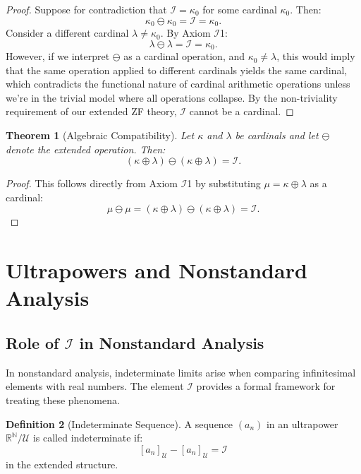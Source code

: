 \documentclass[12pt,a4paper]{article}
\newtheorem{theorem}{Theorem}[section]
\theoremstyle{definition}
\newtheorem{definition}[theorem]{Definition}
\theoremstyle{remark}
\begin{document}
\begin{proof}
Suppose for contradiction that $\mathcal{I} = \kappa_0$ for some cardinal $\kappa_0$. Then:
\[
\kappa_0 \ominus \kappa_0 = \mathcal{I} = \kappa_0.
\]
Consider a different cardinal $\lambda \neq \kappa_0$. By Axiom $\mathcal{I}$1:
\[
\lambda \ominus \lambda = \mathcal{I} = \kappa_0.
\]
However, if we interpret $\ominus$ as a cardinal operation, and $\kappa_0 \neq \lambda$, this would imply that the same operation applied to different cardinals yields the same cardinal, which contradicts the functional nature of cardinal arithmetic operations unless we're in the trivial model where all operations collapse. By the non-triviality requirement of our extended ZF theory, $\mathcal{I}$ cannot be a cardinal.
\end{proof}

\begin{theorem}[Algebraic Compatibility]
\label{thm:algebraic}
Let $\kappa$ and $\lambda$ be cardinals and let $\ominus$ denote the extended operation. Then:
\[
(\kappa \oplus \lambda) \ominus (\kappa \oplus \lambda) = \mathcal{I}.
\]
\end{theorem}

\begin{proof}
This follows directly from Axiom $\mathcal{I}$1 by substituting $\mu = \kappa \oplus \lambda$ as a cardinal:
\[
\mu \ominus \mu = (\kappa \oplus \lambda) \ominus (\kappa \oplus \lambda) = \mathcal{I}.
\]
\end{proof}

\section{Ultrapowers and Nonstandard Analysis}

\subsection{Role of $\mathcal{I}$ in Nonstandard Analysis}

In nonstandard analysis, indeterminate limits arise when comparing infinitesimal elements with real numbers. The element $\mathcal{I}$ provides a formal framework for treating these phenomena.

\begin{definition}[Indeterminate Sequence]
A sequence $(a_n)$ in an ultrapower $\mathbb{R}^{\mathbb{N}}/\mathcal{U}$ is called indeterminate if:
\[
[a_n]_{\mathcal{U}} - [a_n]_{\mathcal{U}} = \mathcal{I}
\]
in the extended structure.
\end{definition}
\end{document}
